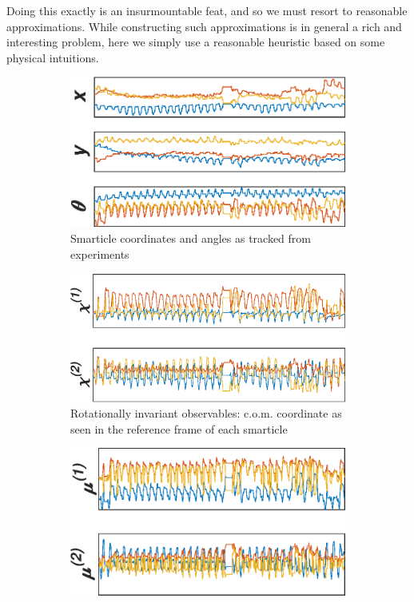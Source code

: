 \documentclass[reprint,prx]{revtex4-1}
\renewcommand{\=}[1]{\stackrel{#1}{=}} %
\renewcommand{\(}{\left (}
\renewcommand{\)}{\right  )}
\renewcommand{\[}{\left [}
\renewcommand{\]}{\right ]}
\newcommand{\<}{\left <}
\renewcommand{\>}{\right >}
\theoremstyle{definition}
\theoremstyle{remark}
\begin{document}
Doing this exactly is an insurmountable feat, and so we must resort to reasonable approximations. While constructing such approximations is in general a rich and interesting problem, here we simply use a reasonable heuristic based on some physical intuitions. 


\begin{figure} 
	\begin{subfigure}[t]{0.4\textwidth}
		\includegraphics[width=1\textwidth]{crdDat.eps}
		\caption{Smarticle coordinates and angles as tracked from experiments \label{fig:crdDat}}
	\end{subfigure}
	\begin{subfigure}[t]{0.4\textwidth}
		\includegraphics[width=1\textwidth]{relDat.eps}
		\caption{Rotationally invariant observables: c.o.m. coordinate as seen in the reference frame of each smarticle \label{fig:relDat}}
	\end{subfigure}
	\begin{subfigure}[t]{0.4\textwidth}
		\includegraphics[width=1\textwidth]{piDat.eps}

\end{subfigure}
\end{figure}
\end{document}
